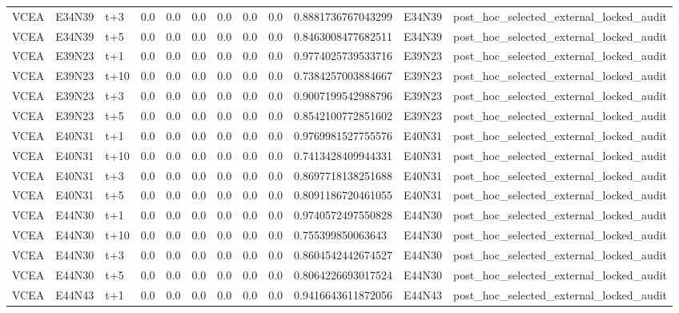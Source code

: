 \begin{landscape}
\begin{longtable}{llllllllllll}
VCEA & E34N39 & t+3 & 0.0 & 0.0 & 0.0 & 0.0 & 0.0 & 0.0 & 0.8881736767043299 & E34N39 & post\_hoc\_selected\_external\_locked\_audit \\
VCEA & E34N39 & t+5 & 0.0 & 0.0 & 0.0 & 0.0 & 0.0 & 0.0 & 0.8463008477682511 & E34N39 & post\_hoc\_selected\_external\_locked\_audit \\
VCEA & E39N23 & t+1 & 0.0 & 0.0 & 0.0 & 0.0 & 0.0 & 0.0 & 0.9774025739533716 & E39N23 & post\_hoc\_selected\_external\_locked\_audit \\
VCEA & E39N23 & t+10 & 0.0 & 0.0 & 0.0 & 0.0 & 0.0 & 0.0 & 0.7384257003884667 & E39N23 & post\_hoc\_selected\_external\_locked\_audit \\
VCEA & E39N23 & t+3 & 0.0 & 0.0 & 0.0 & 0.0 & 0.0 & 0.0 & 0.9007199542988796 & E39N23 & post\_hoc\_selected\_external\_locked\_audit \\
VCEA & E39N23 & t+5 & 0.0 & 0.0 & 0.0 & 0.0 & 0.0 & 0.0 & 0.8542100772851602 & E39N23 & post\_hoc\_selected\_external\_locked\_audit \\
VCEA & E40N31 & t+1 & 0.0 & 0.0 & 0.0 & 0.0 & 0.0 & 0.0 & 0.9769981527755576 & E40N31 & post\_hoc\_selected\_external\_locked\_audit \\
VCEA & E40N31 & t+10 & 0.0 & 0.0 & 0.0 & 0.0 & 0.0 & 0.0 & 0.7413428409944331 & E40N31 & post\_hoc\_selected\_external\_locked\_audit \\
VCEA & E40N31 & t+3 & 0.0 & 0.0 & 0.0 & 0.0 & 0.0 & 0.0 & 0.8697718138251688 & E40N31 & post\_hoc\_selected\_external\_locked\_audit \\
VCEA & E40N31 & t+5 & 0.0 & 0.0 & 0.0 & 0.0 & 0.0 & 0.0 & 0.8091186720461055 & E40N31 & post\_hoc\_selected\_external\_locked\_audit \\
VCEA & E44N30 & t+1 & 0.0 & 0.0 & 0.0 & 0.0 & 0.0 & 0.0 & 0.9740572497550828 & E44N30 & post\_hoc\_selected\_external\_locked\_audit \\
VCEA & E44N30 & t+10 & 0.0 & 0.0 & 0.0 & 0.0 & 0.0 & 0.0 & 0.755399850063643 & E44N30 & post\_hoc\_selected\_external\_locked\_audit \\
VCEA & E44N30 & t+3 & 0.0 & 0.0 & 0.0 & 0.0 & 0.0 & 0.0 & 0.8604542442674527 & E44N30 & post\_hoc\_selected\_external\_locked\_audit \\
VCEA & E44N30 & t+5 & 0.0 & 0.0 & 0.0 & 0.0 & 0.0 & 0.0 & 0.8064226693017524 & E44N30 & post\_hoc\_selected\_external\_locked\_audit \\
VCEA & E44N43 & t+1 & 0.0 & 0.0 & 0.0 & 0.0 & 0.0 & 0.0 & 0.9416643611872056 & E44N43 & post\_hoc\_selected\_external\_locked\_audit \\

\end{longtable}
\end{landscape}
